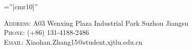 \documentclass[a4paper,10pt]{article} %
\begin{document}
\pagestyle{empty} %
\font\fb=''[cmr10]'' %

\par{\bigskip\par} %

\begin{center}
\textsc{Address:} A03 Wenxing Plaza Industrial Park Suzhou Jiangsu\\
\textsc{Phone:}  (+86) 131-4188-2486\\
\textsc{Email:}  {Xiaohan.Zhang15@student.xjtlu.edu.cn}\\

\end{center}
\end{document}
